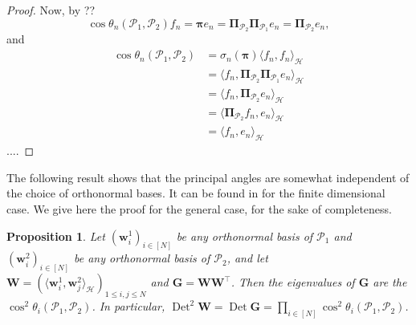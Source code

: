 \documentclass[twoside,11pt]{book}
\newtheorem{proposition}{Proposition}
\numberwithin{theorem}{chapter}
\numberwithin{definition}{chapter}
\numberwithin{proposition}{chapter}
\numberwithin{corollary}{chapter}
\numberwithin{example}{chapter}
\numberwithin{lemma}{chapter}
\numberwithin{assumption}{chapter}
\DeclareMathOperator{\Det}{Det}
\DeclareMathOperator{\Tran}{\intercal}
\begin{document}
\begin{proof}
Now, by ??
\begin{equation}
\cos \theta_n(\mathcal{P}_1,\mathcal{P}_2) f_{n} = \bm{\pi} e_{n} = \bm{\Pi}_{\mathcal{P}_{2}} \bm{\Pi}_{\mathcal{P}_{1}} e_{n} = \bm{\Pi}_{\mathcal{P}_{2}} e_{n},
\end{equation}
and
\begin{align}
\cos \theta_n(\mathcal{P}_1,\mathcal{P}_2) & = \sigma_n(\bm{\pi}) \langle f_{n}, f_{n} \rangle_{\mathcal{H}} \nonumber \\
& = \langle f_{n},\bm{\Pi}_{\mathcal{P}_2} \bm{\Pi}_{\mathcal{P}_1} e_{n}\rangle_{\mathcal{H}} \nonumber \\
& = \langle f_{n}, \bm{\Pi}_{\mathcal{P}_2} e_{n} \rangle_{\mathcal{H}} \nonumber \\
& = \langle \bm{\Pi}_{\mathcal{P}_2} f_{n},  e_{n} \rangle_{\mathcal{H}} \nonumber \\
& = \langle f_{n},  e_{n} \rangle_{\mathcal{H}}
\end{align}
....
\end{proof}



The following result shows that the principal angles are somewhat independent of the choice of orthonormal bases. It can be found in \cite{BjGo73,MiBe92} for the finite dimensional case. We give here the proof for the general case, for the sake of completeness.
\begin{proposition}\label{prop:cos_det_relationship}
Let $(\bm{w}^{1}_{i})_{i \in [N]}$ be any orthonormal basis of $\mathcal{P}_{1}$ and $(\bm{w}^{2}_{i})_{i \in [N]}$ be any orthonormal basis of $\mathcal{P}_{2}$, and let $\bm{W} = (\langle \bm{w}^{1}_{i},\bm{w}^{2}_{j} \rangle_{\mathcal{H}})_{1\leq i,j \leq N}$ and $\bm{G} = \bm{W}\bm{W}^{\Tran}$. Then
the eigenvalues of $\bm{G}$ are the $\cos^{2} \theta_{i}(\mathcal{P}_{1},\mathcal{P}_{2})$. In particular, $\Det^{2} \bm{W} = \Det \bm{G} =  \prod\limits_{i \in [N]} \cos^{2} \theta_{i}(\mathcal{P}_{1},\mathcal{P}_{2})$.
\end{proposition}
\end{document}
